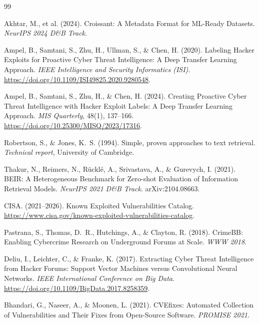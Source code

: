 \documentclass{article}
\begin{document}
\begin{thebibliography}{99}
\small

Akhtar, M., et al. (2024). Croissant: A Metadata Format
for ML-Ready Datasets. \textit{NeurIPS 2024 D\&B Track}.

Ampel, B., Samtani, S., Zhu, H., Ullman, S., \& Chen, H. (2020).
Labeling Hacker Exploits for Proactive Cyber Threat Intelligence: A Deep
Transfer Learning Approach. \textit{IEEE Intelligence and Security
Informatics (ISI)}. \url{https://doi.org/10.1109/ISI49825.2020.9280548}.

Ampel, B., Samtani, S., Zhu, H., \& Chen, H. (2024).
Creating Proactive Cyber Threat Intelligence with Hacker Exploit Labels:
A Deep Transfer Learning Approach. \textit{MIS Quarterly}, 48(1), 137--166.
\url{https://doi.org/10.25300/MISQ/2023/17316}.

Robertson, S., \& Jones, K.\ S. (1994).
Simple, proven approaches to text retrieval.
\textit{Technical report}, University of Cambridge.

Thakur, N., Reimers, N., R{\"u}ckl{\'e}, A., Srivastava, A., \&
Gurevych, I. (2021). BEIR: A Heterogeneous Benchmark for Zero-shot
Evaluation of Information Retrieval Models. \textit{NeurIPS 2021 D\&B
Track}. arXiv:2104.08663.

CISA. (2021--2026). Known Exploited Vulnerabilities Catalog.
\url{https://www.cisa.gov/known-exploited-vulnerabilities-catalog}.

Pastrana, S., Thomas, D.\ R., Hutchings, A., \&
Clayton, R. (2018). CrimeBB: Enabling Cybercrime Research on Underground
Forums at Scale. \textit{WWW 2018}.

Deliu, I., Leichter, C., \& Franke, K. (2017).
Extracting Cyber Threat Intelligence from Hacker Forums: Support Vector
Machines versus Convolutional Neural Networks.
\textit{IEEE International Conference on Big Data}.
\url{https://doi.org/10.1109/BigData.2017.8258359}.

Bhandari, G., Naseer, A., \& Moonen, L. (2021).
CVEfixes: Automated Collection of Vulnerabilities and Their Fixes from
Open-Source Software. \textit{PROMISE 2021}.


\end{thebibliography}
\end{document}
